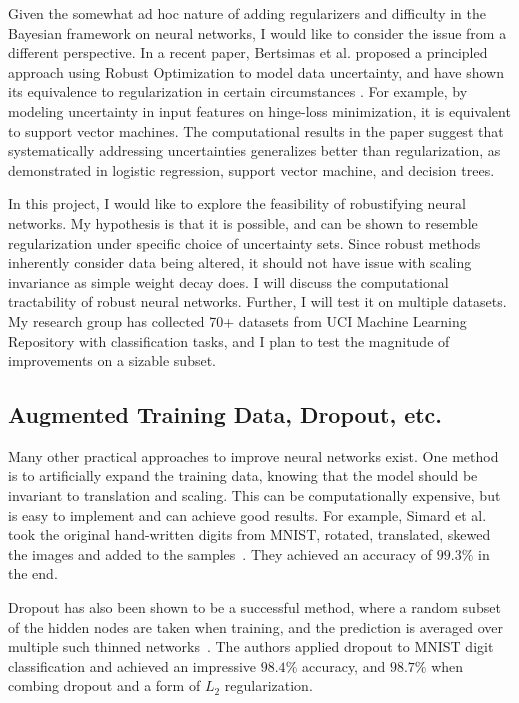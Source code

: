 \documentclass[twoside,12pt]{article}
\begin{document}
Given the somewhat ad hoc nature of adding regularizers and difficulty in the Bayesian framework on neural networks, I would like to consider the issue from a different perspective. In a recent paper, Bertsimas et al. proposed a principled approach using Robust Optimization to model data uncertainty, and have shown its equivalence to regularization in certain circumstances \cite{bertsimas2015robust}. For example, by modeling uncertainty in input features  on hinge-loss minimization, it is equivalent to support vector machines. The computational results in the paper suggest that systematically addressing uncertainties generalizes better than regularization, as demonstrated in logistic regression, support vector machine, and decision trees. 

In this project, I would like to explore the feasibility of robustifying neural networks. My hypothesis is that it is possible, and can be shown to resemble regularization under specific choice of uncertainty sets. Since robust methods inherently consider data being altered, it should not have issue with scaling invariance as simple weight decay does. I will discuss the computational tractability of robust neural networks. Further, I will test it on multiple datasets. My research group has collected 70+ datasets from UCI Machine Learning Repository with classification tasks, and I plan to test the magnitude of improvements on a sizable subset.

\subsection{Augmented Training Data, Dropout, etc.}

Many other practical approaches to improve neural networks exist. One method is to artificially expand the training data, knowing that the model should be invariant to translation and scaling. This can be computationally expensive, but is easy to implement and can achieve good results. For example, Simard et al. took the original hand-written digits from MNIST, rotated, translated, skewed the images and added to the samples~\cite{simard2003best}. They achieved an accuracy of $99.3\%$ in the end. 

Dropout has also been shown to be a successful method, where a random subset of the hidden nodes are taken when training, and the prediction is averaged over multiple such thinned networks~\cite{hinton2012improving, srivastava2014dropout}. The authors applied dropout to MNIST digit classification and achieved an impressive $98.4\%$ accuracy, and $98.7\%$ when combing dropout and a form of $L_2$ regularization.
\end{document}
